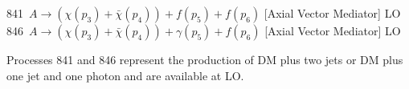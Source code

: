 841~$A\to({\chi}(p_3)+\bar{\chi}(p_4)) +f(p_5)+f(p_6)$ [Axial Vector Mediator]   LO \\
846~$A\to({\chi}(p_3)+\bar{\chi}(p_4)) +\gamma(p_5)+f(p_6)$ [Axial Vector Mediator]   LO

Processes 841 and 846 represent the production of
DM plus two jets or DM plus one jet and one photon and are available
at LO.
